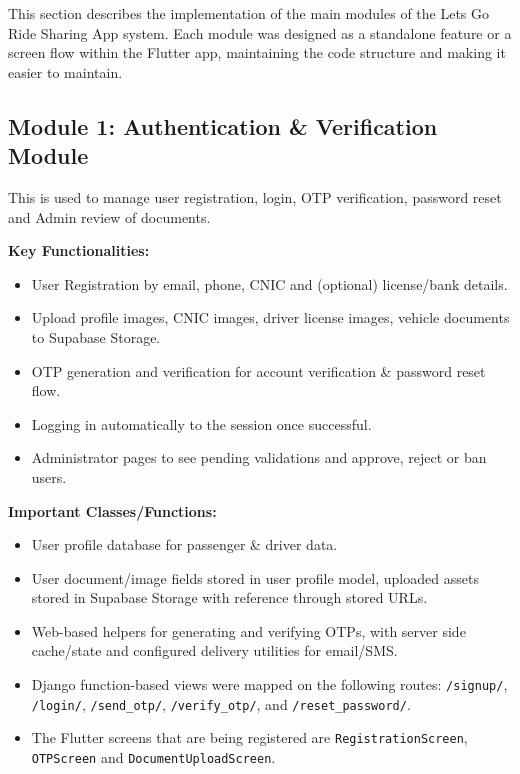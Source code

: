 This section describes the implementation of the main modules of the Lets Go Ride Sharing App system. Each module was designed as a standalone feature or a screen flow within the Flutter app, maintaining the code structure and making it easier to maintain.

\subsection{Module 1: Authentication \& Verification Module}

This is used to manage user registration, login, OTP verification, password reset and Admin review of documents.

\textbf{Key Functionalities:}
\begin{itemize}
    \item User Registration by email, phone, CNIC and (optional) license/bank details.
    \item Upload profile images, CNIC images, driver license images, vehicle documents to Supabase Storage.
    \item OTP generation and verification for account verification \& password reset flow.
    \item Logging in automatically to the session once successful.
    \item Administrator pages to see pending validations and approve, reject or ban users.
\end{itemize}

\textbf{Important Classes/Functions:}
\begin{itemize}
    \item User profile database for passenger \& driver data.
    \item User document/image fields stored in user profile model, uploaded assets stored in Supabase Storage with reference through stored URLs.
    \item Web-based helpers for generating and verifying OTPs, with server side cache/state and configured delivery utilities for email/SMS.
    \item Django function-based views were mapped on the following routes: \texttt{/signup/}, \texttt{/login/}, \texttt{/send\_otp/}, \texttt{/verify\_otp/}, and \texttt{/reset\_password/}.
    \item The Flutter screens that are being registered are \texttt{RegistrationScreen}, \texttt{OTPScreen} and \texttt{DocumentUploadScreen}.
\end{itemize}

